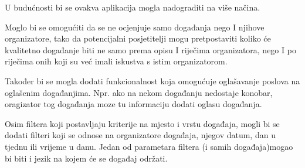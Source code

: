 	U budućnosti bi se ovakva aplikacija mogla nadograditi na više načina.
 
	Moglo bi se omogućiti da se ne ocjenjuje samo događanja nego I njihove organizatore, tako da potencijalni posjetitelji mogu pretpostaviti koliko će kvalitetno događanje biti ne samo prema opisu I riječima organizatora, nego I po riječima onih koji su već imali iskustva s istim organizatorom.
 
	Također bi se mogla dodati funkcionalnost koja omogućuje oglašavanje poslova na oglašenim događanjima. Npr. ako na nekom događanju nedostaje konobar, oragizator tog događanja moze tu informaciju dodati oglasu događanja. 
 
	Osim filtera koji postavljaju kriterije na mjesto i vrstu događaja, mogli bi se dodati filteri koji se odnose na organizatore događaja, njegov datum, dan u tjednu ili vrijeme u danu. Jedan od parametara filtera (i samih događaja)mogao bi biti i jezik na kojem će se događaj održati.

			
		
		
